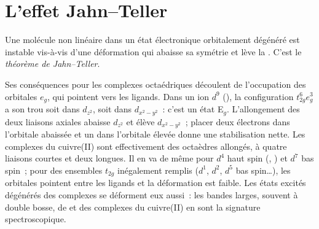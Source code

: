 \section{L'effet Jahn--Teller}

\begin{theorem}\label{thm:b3:complex-spectra-magnetism:jahn-teller}
Une molécule non linéaire dans un état électronique orbitalement dégénéré
est instable vis-à-vis d'une déformation qui abaisse sa symétrie et lève la
. C'est le \emph{théorème de Jahn--Teller}.
\end{theorem}

\admitted

Ses conséquences pour les complexes octaédriques découlent de l'occupation
des orbitales $e_g$, qui pointent vers les ligands. Dans un ion $d^9$
(), la configuration $t_{2g}^6e_g^3$ a son trou soit dans
$d_{z^2}$, soit dans $d_{x^2-y^2}$~: c'est un état E$_g$. L'allongement des
deux liaisons axiales abaisse $d_{z^2}$ et élève $d_{x^2-y^2}$~; placer
deux électrons dans l'orbitale abaissée et un dans l'orbitale élevée donne
une stabilisation nette. Les complexes du cuivre(II) sont effectivement des
octaèdres allongés, à quatre liaisons courtes et deux longues. Il en va de
même pour $d^4$ haut spin (, ) et $d^7$ bas spin~;
pour des ensembles $t_{2g}$ inégalement remplis ($d^1$, $d^2$, $d^5$ bas
spin\dots), les orbitales pointent entre les ligands et la déformation est
faible. Les états excités dégénérés des complexes se déforment eux aussi~:
les bandes larges, souvent à double bosse, de  et des
complexes du cuivre(II) en sont la signature spectroscopique.

